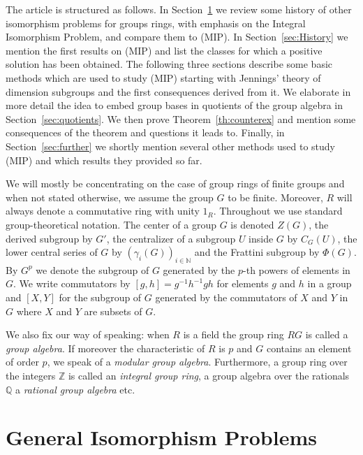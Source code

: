 \documentclass[11pt, a4paper]{amsart}
\theoremstyle{definition}
\begin{document}
The article is structured as follows. In Section~\ref{sec:GeneralIPs} we review some history of other isomorphism problems for groups rings, with emphasis on the Integral Isomorphism Problem, and compare them to (MIP). In Section~\ref{sec:History} we mention the first results on (MIP) and list the classes for which a positive solution has been obtained. The following three sections describe some basic methods which are used to study (MIP) starting with Jennings' theory of dimension subgroups and the first consequences derived from it. We elaborate in more detail the idea to embed group bases in quotients of the group algebra in Section~\ref{sec:quotients}. We then prove Theorem~\ref{th:counterex} and mention some consequences of the theorem and questions it leads to. Finally, in Section~\ref{sec:further} we shortly mention several other methods used to study (MIP) and which results they provided so far.

We will mostly be concentrating on the case of group rings of finite groups and when not stated otherwise, we assume the group $G$ to be finite. Moreover, $R$ will always denote a commutative ring with unity $1_R$.
Throughout we use standard group-theoretical notation. The center of a group $G$ is denoted $Z(G)$, the derived subgroup by $G'$, the centralizer of a subgroup $U$ inside $G$ by $C_G(U)$,  the lower central series of $G$ by $(\gamma_i(G))_{i \in \mathbb{N}}$ and the Frattini subgroup by $\Phi(G)$. By $G^p$ we denote the subgroup of $G$ generated by the $p$-th powers of elements in $G$. We write commutators by $[g,h] = g^{-1}h^{-1}gh$ for elements $g$ and $h$ in a group and $[X,Y]$ for the subgroup of $G$ generated by the commutators of $X$ and $Y$ in $G$ where $X$ and $Y$ are subsets of $G$.

We also fix our way of speaking: when $R$ is a field the group ring $RG$ is called a \emph{group algebra}. If moreover the characteristic of $R$ is $p$ and $G$ contains an element of order $p$, we speak of a \emph{modular group algebra}. Furthermore, a group ring over the integers $\mathbb{Z}$ is called an \emph{integral group ring}, a group algebra over the rationals $\mathbb{Q}$ a \emph{rational group algebra} etc. 


\section{General Isomorphism Problems}\label{sec:GeneralIPs}
\end{document}
